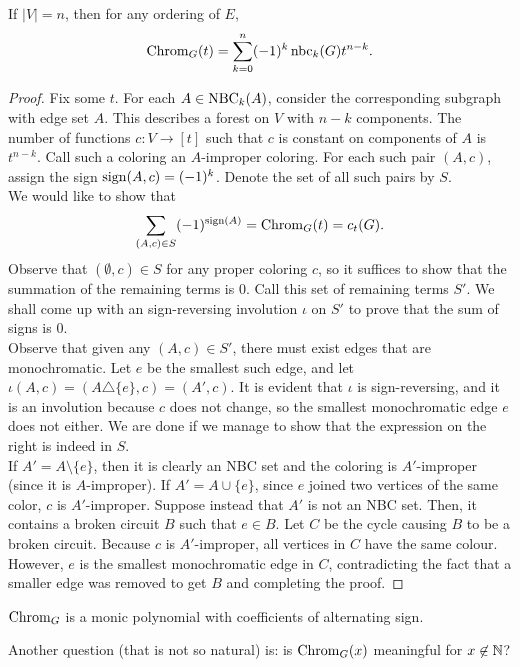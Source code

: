 	\begin{ftheo}
		\label{theo: coeffs of chrom poly nbc}
		If $|V| = n$, then for any ordering of $E$,
		\[ \operatorname{Chrom}_G(t) = \sum_{k=0}^n (-1)^k \operatorname{nbc}_k(G) t^{n-k}. \]	
	\end{ftheo}
	\begin{proof}
		Fix some $t$. For each $A \in \operatorname{NBC}_k(A)$, consider the corresponding subgraph with edge set $A$. This describes a forest on $V$ with $n-k$ components. The number of functions $c : V \to [t]$ such that $c$ is constant on components of $A$ is $t^{n-k}$. Call such a coloring an $A$-improper coloring. For each such pair $(A,c)$, assign the sign $\operatorname{sign}(A,c) = (-1)^k$. Denote the set of all such pairs by $S$. \\
		We would like to show that
		\[ \sum_{(A,c) \in S} (-1)^{\operatorname{sign}(A)} = \operatorname{Chrom}_G(t) = c_t(G). \]
		Observe that $(\emptyset,c) \in S$ for any proper coloring $c$, so it suffices to show that the summation of the remaining terms is $0$. Call this set of remaining terms $S'$. We shall come up with an sign-reversing involution $\iota$ on $S'$ to prove that the sum of signs is $0$.\\
		Observe that given any $(A,c) \in S'$, there must exist edges that are monochromatic. Let $e$ be the smallest such edge, and let $\iota(A,c) = (A\triangle \{e\},c) = (A',c)$. It is evident that $\iota$ is sign-reversing, and it is an involution because $c$ does not change, so the smallest monochromatic edge $e$ does not either. We are done if we manage to show that the expression on the right is indeed in $S$.\\
		If $A' = A \setminus \{e\}$, then it is clearly an NBC set and the coloring is $A'$-improper (since it is $A$-improper). If $A' = A \cup \{e\}$, since $e$ joined two vertices of the same color, $c$ is $A'$-improper. Suppose instead that $A'$ is not an NBC set. Then, it contains a broken circuit $B$ such that $e \in B$. Let $C$ be the cycle causing $B$ to be a broken circuit. Because $c$ is $A'$-improper, all vertices in $C$ have the same colour. However, $e$ is the smallest monochromatic edge in $C$, contradicting the fact that a smaller edge was removed to get $B$ and completing the proof.
	\end{proof}

	\begin{fcor}
		$\operatorname{Chrom}_G$ is a monic polynomial with coefficients of alternating sign.
	\end{fcor}

	Another question (that is not so natural) is: is $\operatorname{Chrom}_G(x)$ meaningful for $x\not\in\mathbb{N}$?

